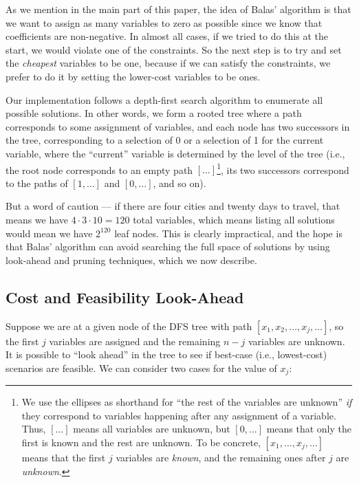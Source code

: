 \documentclass{article}
\begin{document}
As we mention in the main part of this paper, the idea of Balas' algorithm is that we want to assign as many variables to zero as possible since we
know that coefficients are non-negative. In almost all cases, if we tried to do this at the start, we would violate one of the constraints. So the
next step is to try and set the \emph{cheapest} variables to be one, because if we can satisfy the constraints, we prefer to do it by setting the
lower-cost variables to be ones.

Our implementation follows a depth-first search algorithm to enumerate all possible solutions. In other words, we form a rooted tree where a path
corresponds to some assignment of variables, and each node has two successors in the tree, corresponding to a selection of 0 or a selection of 1 for
the current variable, where the ``current'' variable is determined by the level of the tree (i.e., the root node corresponds to an empty path
$[\ldots]$\footnote{We use the ellipses as shorthand for ``the rest of the variables are unknown'' \emph{if} they correspond to variables happening
after any assignment of a variable. Thus, $[\ldots]$ means all variables are unknown, but $[0,\ldots]$ means that only the first is known and the rest
are unknown. To be concrete, $[x_1, \ldots, x_j, \ldots]$ means that the first $j$ variables are \emph{known}, and the remaining ones after $j$ are
\emph{unknown}.}, its two successors correspond to the paths of $[1, \ldots]$ and $[0, \ldots]$, and so on).

But a word of caution --- if there are four cities and twenty days to travel, that means we have $4 \cdot 3 \cdot 10 = 120$ total variables, which
means listing all solutions would mean we have $2^{120}$ leaf nodes. This is clearly impractical, and the hope is that Balas' algorithm can avoid
searching the full space of solutions by using look-ahead and pruning techniques, which we now describe.

\subsection{Cost and Feasibility Look-Ahead}\label{app:balas_lookahead}

Suppose we are at a given node of the DFS tree with path $[x_1, x_2, \ldots, x_j, \ldots]$, so the first $j$ variables are assigned and the remaining
$n-j$ variables are unknown. It is possible to ``look ahead'' in the tree to see if best-case (i.e., lowest-cost) scenarios are feasible. We can
consider two cases for the value of $x_j$:
\end{document}
